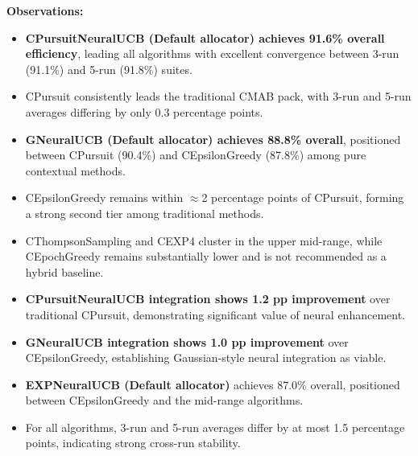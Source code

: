\documentclass[12pt,a4paper]{article}
\newcommand{\legacy}[1]{\textcolor{legacycolor}{\textbf{#1}}}
\newcommand{\neural}[1]{\textcolor{neuralcolor}{\textbf{#1}}}
\begin{document}
\begin{tcolorbox}[colback=performancecolor!10,colframe=performancecolor,title=\textbf{Primary Performance Results (Aggregated Across Capacities, Environments, and Regimes)}]
\textbf{Observations:}
\begin{itemize}
\item \neural{CPursuitNeuralUCB (Default allocator) achieves 91.6\% overall efficiency}, leading all algorithms with excellent convergence between 3-run (91.1\%) and 5-run (91.8\%) suites.
\item CPursuit consistently leads the traditional CMAB pack, with 3-run and 5-run averages differing by only 0.3 percentage points.
\item \neural{GNeuralUCB (Default allocator) achieves 88.8\% overall}, positioned between CPursuit (90.4\%) and CEpsilonGreedy (87.8\%) among pure contextual methods.
\item CEpsilonGreedy remains within $\approx$2 percentage points of CPursuit, forming a strong second tier among traditional methods.
\item CThompsonSampling and CEXP4 cluster in the upper mid-range, while CEpochGreedy remains substantially lower and is not recommended as a hybrid baseline.
\item \neural{CPursuitNeuralUCB integration shows 1.2 pp improvement} over traditional CPursuit, demonstrating significant value of neural enhancement.
\item \neural{GNeuralUCB integration shows 1.0 pp improvement} over CEpsilonGreedy, establishing Gaussian-style neural integration as viable.
\item \legacy{EXPNeuralUCB (Default allocator)} achieves 87.0\% overall, positioned between CEpsilonGreedy and the mid-range algorithms.
\item For all algorithms, 3-run and 5-run averages differ by at most 1.5 percentage points, indicating strong cross-run stability.
\end{itemize}

\end{tcolorbox}
\end{document}
